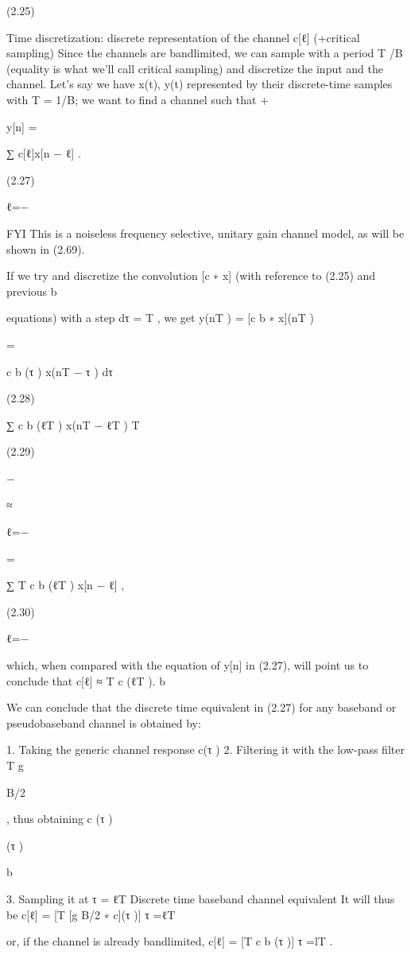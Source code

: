 {(2.25)

Time discretization: discrete representation of the channel c[ℓ] (+critical sampling)
Since the channels are bandlimited, we can sample with a period T /B (equality is what we'll call critical sampling) and discretize the input and the channel.
Let's say we have x(t), y(t) represented by their discrete-time samples with T = 1/B; we want to find a channel such that
+\infty

y[n] =

∑ c[ℓ]x[n − ℓ] .

(2.27)

ℓ=−\infty

​FYI This is a noiseless frequency selective, unitary gain channel model, as will be shown in (2.69).

If we try and discretize the convolution [c ∗ x] (with reference to (2.25) and previous b

equations) with a step dτ = T , we get y(nT ) = [c b ∗ x](nT )
\infty

= \int

c b (τ ) x(nT − τ ) dτ

(2.28)

∑ c b (ℓT ) x(nT − ℓT ) T

(2.29)

−\infty
\infty

≈

ℓ=−\infty
\infty

=

∑ T c b (ℓT ) x[n − ℓ] ,

(2.30)

ℓ=−\infty

which, when compared with the equation of y[n] in (2.27), will point us to conclude that c[ℓ] ≈ T c (ℓT ).
b

We can conclude that the discrete time equivalent in (2.27) for any baseband or pseudobaseband channel is obtained by:

1. Taking the generic channel response c(τ )
2. Filtering it with the low-pass filter T g

B/2

, thus obtaining c (τ )

(τ )

b

3. Sampling it at τ = ℓT Discrete time baseband channel equivalent It will thus be c[ℓ] = [T [g B/2 ∗ c](τ )] τ =ℓT

or, if the channel is already bandlimited,
c[ℓ] = [T c b (τ )] τ =lT .

}
